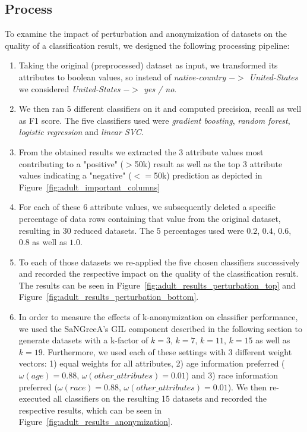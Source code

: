 \documentclass{llncs}
\begin{document}
\subsection{Process}
\label{ssect:process}

To examine the impact of perturbation and anonymization of datasets on the quality of a classification result, we designed the following processing pipeline:


\begin{enumerate}
	\item Taking the original (preprocessed) dataset as input, we transformed its attributes to boolean values, so instead of \textit{native-country $->$ United-States} we considered \textit{United-States $->$ yes / no}.
	\item We then ran 5 different classifiers on it and computed precision, recall as well as F1 score. The five classifiers used were \textit{gradient boosting}, \textit{random forest}, \textit{logistic regression} and \textit{linear SVC}.
	\item From the obtained results we extracted the 3 attribute values most contributing to a "positive" ($>$50k) result as well as the top 3 attribute values indicating a "negative" ($<=$50k) prediction as depicted in Figure~\ref{fig:adult_important_columns}
	\item For each of these 6 attribute values, we subsequently deleted a specific percentage of data rows containing that value from the original dataset, resulting in 30 reduced datasets. The 5 percentages used were $0.2$, $0.4$, $0.6$, $0.8$ as well as $1.0$.
	\item To each of those datasets we re-applied the five chosen classifiers successively and recorded the respective impact on the quality of the classification result. The results can be seen in Figure~\ref{fig:adult_results_perturbation_top} and Figure~\ref{fig:adult_results_perturbation_bottom}.
	\item In order to measure the effects of k-anonymization on classifier performance, we used the SaNGreeA's GIL component described in the following section to generate datasets with a k-factor of $k=3$, $k=7$, $k=11$, $k=15$ as well as $k=19$. Furthermore, we used each of these settings with 3 different weight vectors: 1) equal weights for all attributes, 2) age information preferred ($\omega(age)=0.88$, $\omega(other\_attributes)=0.01$) and 3) race information preferred ($\omega(race)=0.88$, $\omega(other\_attributes)=0.01$). We then re-executed all classifiers on the resulting 15 datasets and recorded the respective results, which can be seen in Figure~\ref{fig:adult_results_anonymization}.
\end{enumerate}
\end{document}
